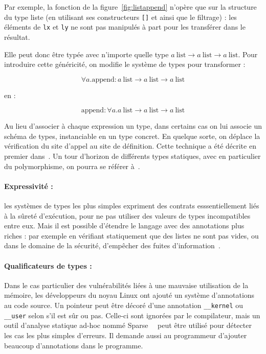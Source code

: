 Par exemple, la fonction de la figure~\ref{fig:listappend} n'opère que sur la
structure du type liste (en utilisant ses constructeurs \texttt{{[}{]}} et
\listcons ainsi que le filtrage) : les éléments de \texttt{lx} et \texttt{ly} ne
sont pas manipulés à part pour les transférer dans le résultat.


Elle peut donc être typée avec n'importe quelle type 
$a~\textrm{list} → a~\textrm{list} → a~\textrm{list}$. Pour introduire cette
généricité, on modifie le système de types pour transformer :

\[ ∀ a. \textrm{append} :
   a~\textrm{list} → a~\textrm{list} → a~\textrm{list}
\]

en :

\[ \textrm{append} : ∀ a.
   a~\textrm{list} → a~\textrm{list} → a~\textrm{list}
\]



Au lieu d'associer à chaque expression un type, dans certains cas on lui associe
un schéma de types, instanciable en un type concret. En quelque sorte, on
déplace la vérification du site d'appel au site de définition. Cette technique a
été décrite en premier dans~\cite{Milner78}.
Un tour d'horizon de différents types statiques, avec en particulier du
polymorphisme, on pourra se référer à~\cite{TAPL}.

\paragraph{Expressivité :} les systèmes de types les plus simples expriment des
contrats esssentiellement liés à la sûreté d'exécution, pour ne pas utiliser des
valeurs de types incompatibles entre eux. Mais il est possible d'étendre le
langage avec des annotations plus riches : par exemple en vérifiant statiquement
que des listes ne sont pas vides\cite{lightweight-static-capabilities}, ou dans
le domaine de la sécurité, d'empêcher des fuites d'information~\cite{LZ06a}.

\paragraph{Qualificateurs de types :} Dans le cas particulier des vulnérabilités
liées à une mauvaise utilisation de la mémoire, les développeurs du noyau Linux
ont ajouté un système d'annotations au code source. Un pointeur peut être décoré
d'une annotation \texttt{\_\_kernel} ou \texttt{\_\_user} selon s'il est sûr ou
pas. Celle-ci sont ignorées par le compilateur, mais un outil d'analyse statique
ad-hoc nommé Sparse~~\cite{TorvaldsSparse} %
peut être utilisé pour détecter les cas les plus simples d'erreurs.
Il demande aussi au programmeur d'ajouter beaucoup d'annotations dans le
programme. %

